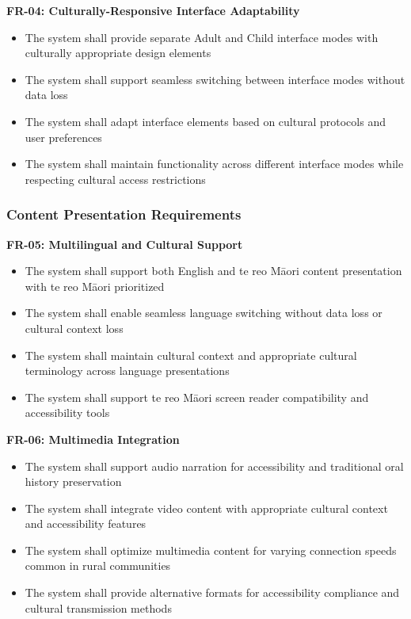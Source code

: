 \textbf{FR-04: Culturally-Responsive Interface Adaptability}
\begin{itemize}
    \item The system shall provide separate Adult and Child interface modes with culturally appropriate design elements
    \item The system shall support seamless switching between interface modes without data loss
    \item The system shall adapt interface elements based on cultural protocols and user preferences
    \item The system shall maintain functionality across different interface modes while respecting cultural access restrictions
\end{itemize}

\subsubsection{Content Presentation Requirements}
\label{subsubsec:content_presentation}

\textbf{FR-05: Multilingual and Cultural Support}
\begin{itemize}
    \item The system shall support both English and te reo M\=aori content presentation with te reo M\=aori prioritized
    \item The system shall enable seamless language switching without data loss or cultural context loss
    \item The system shall maintain cultural context and appropriate cultural terminology across language presentations
    \item The system shall support te reo M\=aori screen reader compatibility and accessibility tools
\end{itemize}

\textbf{FR-06: Multimedia Integration}
\begin{itemize}
    \item The system shall support audio narration for accessibility and traditional oral history preservation
    \item The system shall integrate video content with appropriate cultural context and accessibility features
    \item The system shall optimize multimedia content for varying connection speeds common in rural communities
    \item The system shall provide alternative formats for accessibility compliance and cultural transmission methods
\end{itemize}

